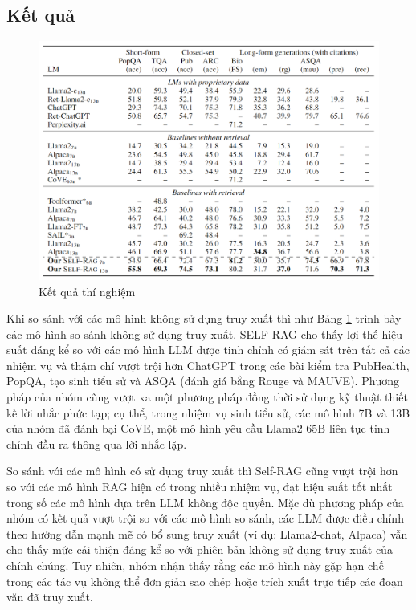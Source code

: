 \documentclass{article}
\begin{document}
\subsection{Kết quả}
\begin{figure} 
    \centering
    \includegraphics[scale = 0.7]{experiments_results.png}
    \caption{Kết quả thí nghiệm}
    \label{fig:experiments_results}
\end{figure}

Khi so sánh với các mô hình không sử dụng truy xuất thì như Bảng \ref{fig:experiments_results} trình bày các mô hình so sánh không sử dụng truy xuất. SELF-RAG  cho thấy lợi thế hiệu suất đáng kể so với các mô hình LLM được tinh chỉnh có giám sát trên tất cả các nhiệm vụ và thậm chí vượt trội hơn ChatGPT trong các bài kiểm tra PubHealth, PopQA, tạo sinh tiểu sử và ASQA (đánh giá bằng Rouge và MAUVE). Phương pháp của nhóm cũng vượt xa một phương pháp đồng thời sử dụng kỹ thuật thiết kế lời nhắc phức tạp; cụ thể, trong nhiệm vụ sinh tiểu sử, các mô hình 7B và 13B của nhóm đã đánh bại CoVE, một mô hình yêu cầu Llama2 65B liên tục tinh chỉnh đầu ra thông qua lời nhắc lặp.

So sánh với các mô hình có sử dụng truy xuất thì Self-RAG cũng vượt trội hơn so với các mô hình RAG hiện có trong nhiều nhiệm vụ, đạt hiệu suất tốt nhất trong số các mô hình dựa trên LLM không độc quyền. Mặc dù phương pháp của nhóm có kết quả vượt trội so với các mô hình so sánh, các LLM được điều chỉnh theo hướng dẫn mạnh mẽ có bổ sung truy xuất (ví dụ: Llama2-chat, Alpaca) vẫn cho thấy mức cải thiện đáng kể so với phiên bản không sử dụng truy xuất của chính chúng. Tuy nhiên, nhóm nhận thấy rằng các mô hình này gặp hạn chế trong các tác vụ không thể đơn giản sao chép hoặc trích xuất trực tiếp các đoạn văn đã truy xuất.
\end{document}
